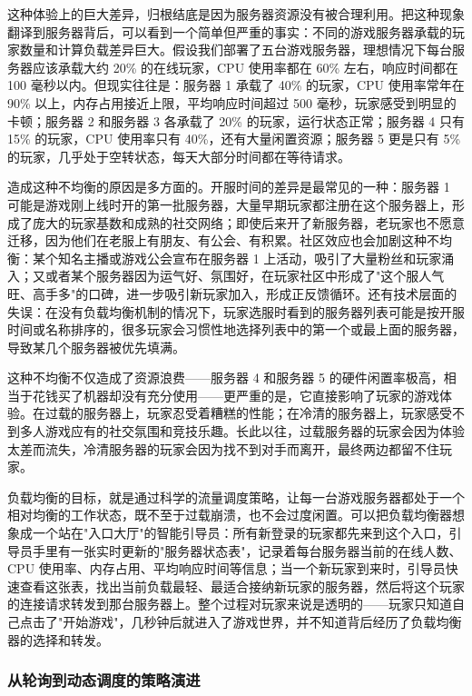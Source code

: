 这种体验上的巨大差异，归根结底是因为服务器资源没有被合理利用。把这种现象翻译到服务器背后，可以看到一个简单但严重的事实：不同的游戏服务器承载的玩家数量和计算负载差异巨大。假设我们部署了五台游戏服务器，理想情况下每台服务器应该承载大约 20\% 的在线玩家，CPU 使用率都在 60\% 左右，响应时间都在 100 毫秒以内。但现实往往是：服务器 1 承载了 40\% 的玩家，CPU 使用率常年在 90\% 以上，内存占用接近上限，平均响应时间超过 500 毫秒，玩家感受到明显的卡顿；服务器 2 和服务器 3 各承载了 20\% 的玩家，运行状态正常；服务器 4 只有 15\% 的玩家，CPU 使用率只有 40\%，还有大量闲置资源；服务器 5 更是只有 5\% 的玩家，几乎处于空转状态，每天大部分时间都在等待请求。

造成这种不均衡的原因是多方面的。开服时间的差异是最常见的一种：服务器 1 可能是游戏刚上线时开的第一批服务器，大量早期玩家都注册在这个服务器上，形成了庞大的玩家基数和成熟的社交网络；即使后来开了新服务器，老玩家也不愿意迁移，因为他们在老服上有朋友、有公会、有积累。社区效应也会加剧这种不均衡：某个知名主播或游戏公会宣布在服务器 1 上活动，吸引了大量粉丝和玩家涌入；又或者某个服务器因为运气好、氛围好，在玩家社区中形成了"这个服人气旺、高手多"的口碑，进一步吸引新玩家加入，形成正反馈循环。还有技术层面的失误：在没有负载均衡机制的情况下，玩家选服时看到的服务器列表可能是按开服时间或名称排序的，很多玩家会习惯性地选择列表中的第一个或最上面的服务器，导致某几个服务器被优先填满。

这种不均衡不仅造成了资源浪费——服务器 4 和服务器 5 的硬件闲置率极高，相当于花钱买了机器却没有充分使用——更严重的是，它直接影响了玩家的游戏体验。在过载的服务器上，玩家忍受着糟糕的性能；在冷清的服务器上，玩家感受不到多人游戏应有的社交氛围和竞技乐趣。长此以往，过载服务器的玩家会因为体验太差而流失，冷清服务器的玩家会因为找不到对手而离开，最终两边都留不住玩家。

负载均衡的目标，就是通过科学的流量调度策略，让每一台游戏服务器都处于一个相对均衡的工作状态，既不至于过载崩溃，也不会过度闲置。可以把负载均衡器想象成一个站在"入口大厅"的智能引导员：所有新登录的玩家都先来到这个入口，引导员手里有一张实时更新的"服务器状态表"，记录着每台服务器当前的在线人数、CPU 使用率、内存占用、平均响应时间等信息；当一个新玩家到来时，引导员快速查看这张表，找出当前负载最轻、最适合接纳新玩家的服务器，然后将这个玩家的连接请求转发到那台服务器上。整个过程对玩家来说是透明的——玩家只知道自己点击了"开始游戏"，几秒钟后就进入了游戏世界，并不知道背后经历了负载均衡器的选择和转发。

\subsubsection{从轮询到动态调度的策略演进}

